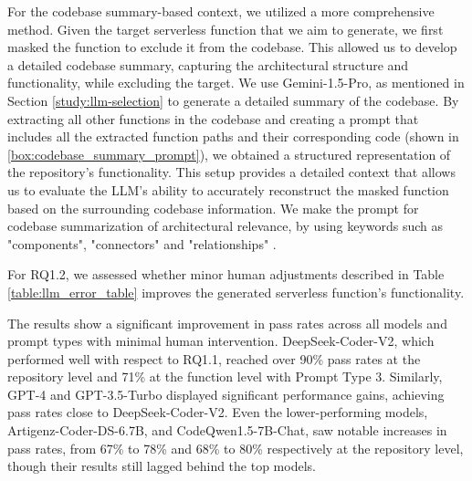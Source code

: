 For the codebase summary-based context, we utilized a more comprehensive method. Given the target serverless function  that we aim to generate, we first masked the function to exclude it from the codebase. This allowed us to develop a detailed codebase summary, capturing the architectural structure and functionality, while excluding the target.  We use Gemini-1.5-Pro, as mentioned in Section \ref{study:llm-selection} to generate a detailed summary of the codebase. By extracting all other functions in the codebase and creating a prompt that includes all the extracted function paths and their corresponding code (shown in \ref{box:codebase_summary_prompt}), we obtained a structured representation of the repository's functionality. This setup provides a detailed context that allows us to evaluate the LLM’s ability to accurately reconstruct the masked function based on the surrounding codebase information. We make the prompt for codebase summarization of architectural relevance, by using keywords such as "components", "connectors" and "relationships" \cite{garlan1993_component_connector}.

For RQ1.2, we assessed whether minor human adjustments described in Table \ref{table:llm_error_table} improves the generated serverless function's functionality. 

The results show a significant improvement in pass rates across all models and prompt types with minimal human intervention. DeepSeek-Coder-V2, which performed well with respect to RQ1.1, reached over 90\% pass rates at the repository level and 71\% at the function level with Prompt Type 3. Similarly, GPT-4 and GPT-3.5-Turbo displayed significant performance gains, achieving pass rates close to DeepSeek-Coder-V2. Even the lower-performing models, Artigenz-Coder-DS-6.7B, and CodeQwen1.5-7B-Chat, saw notable increases in pass rates, 
from 67\% to 78\% and 68\% to 80\% respectively at the repository level, though their results still lagged behind the top models.
\hfill\\
